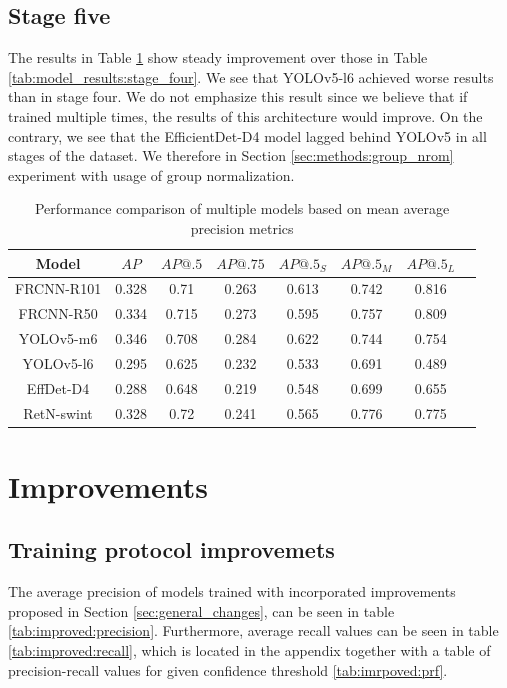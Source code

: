 \subsection{Stage five}
The results in Table \ref{tab:model_results:stage_five} show steady improvement over those in Table \ref{tab:model_results:stage_four}. We see that YOLOv5-l6 achieved worse results than in stage four. We do not emphasize this result since we believe that if trained multiple times, the results of this architecture would improve. On the contrary, we see that the EfficientDet-D4 model lagged behind YOLOv5 in all stages of the dataset. We therefore in Section \ref{sec:methods:group_nrom} experiment with usage of group normalization.
\begin{table}[H]
    \begin{tabular}{|c|c|c|c|c|c|c|c|}
        \hline
        Model      & $AP$  & $AP@.5$ & $AP@.75$ & $AP@.5_S$ & $AP@.5_M$ & $AP@.5_L$ \\ \hline
        FRCNN-R101 & 0.328 & 0.71    & 0.263    & 0.613     & 0.742     & 0.816     \\ \hline
        FRCNN-R50  & 0.334 & 0.715   & 0.273    & 0.595     & 0.757     & 0.809     \\ \hline
        YOLOv5-m6  & 0.346 & 0.708   & 0.284    & 0.622     & 0.744     & 0.754     \\ \hline
        YOLOv5-l6  & 0.295 & 0.625   & 0.232    & 0.533     & 0.691     & 0.489     \\ \hline
        EffDet-D4  & 0.288 & 0.648   & 0.219    & 0.548     & 0.699     & 0.655     \\ \hline
        RetN-swint & 0.328 & 0.72    & 0.241    & 0.565     & 0.776     & 0.775     \\ \hline
    \end{tabular}
    \caption{Performance comparison of multiple models based on mean average precision metrics}
    \label{tab:model_results:stage_five}
\end{table}

\section{Improvements}
\label{sec:model_improvements_results}
\subsection{Training protocol improvemets}
The average precision of models trained with incorporated improvements proposed in Section \ref{sec:general_changes}, can be seen in table \ref{tab:improved:precision}. Furthermore, average recall values can be seen in table \ref{tab:improved:recall}, which is located in the appendix together with a table of precision-recall values for given confidence threshold \ref{tab:imrpoved:prf}.

